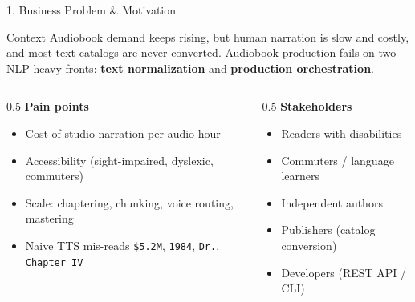 \documentclass[10pt,aspectratio=169]{beamer}
\begin{document}
\begin{frame}{1. Business Problem \& Motivation}
\begin{block}{Context}
Audiobook demand keeps rising, but human narration is slow and costly, and most text catalogs are never converted. Audiobook production fails on two NLP-heavy fronts: \textbf{text normalization} and \textbf{production orchestration}.
\end{block}

\begin{columns}[T]
\begin{column}{0.5\textwidth}
\textbf{Pain points}
\begin{itemize}
  \item Cost of studio narration per audio-hour
  \item Accessibility (sight-impaired, dyslexic, commuters)
  \item Scale: chaptering, chunking, voice routing, mastering
  \item Naive TTS mis-reads \texttt{\$5.2M}, \texttt{1984}, \texttt{Dr.}, \texttt{Chapter IV}
\end{itemize}
\end{column}
\begin{column}{0.5\textwidth}
\textbf{Stakeholders}
\begin{itemize}
  \item Readers with disabilities
  \item Commuters / language learners
  \item Independent authors
  \item Publishers (catalog conversion)
  \item Developers (REST API / CLI)
\end{itemize}
\end{column}
\end{columns}
\end{frame}
\end{document}
